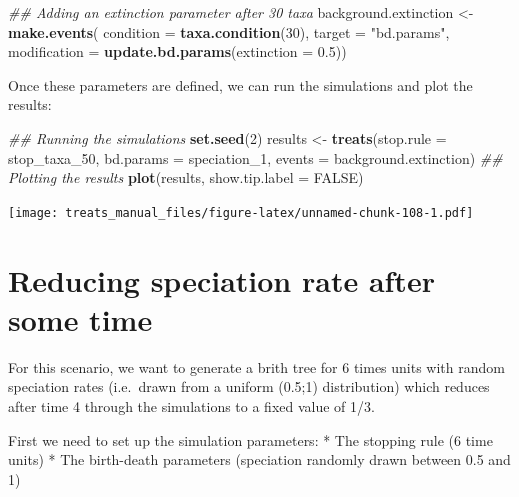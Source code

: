 \documentclass[
]{book}
\newenvironment{Shaded}{\begin{snugshade}}{\end{snugshade}}
\newcommand{\CommentTok}[1]{\textcolor[rgb]{0.56,0.35,0.01}{\textit{#1}}}
\newcommand{\DataTypeTok}[1]{\textcolor[rgb]{0.13,0.29,0.53}{#1}}
\newcommand{\DecValTok}[1]{\textcolor[rgb]{0.00,0.00,0.81}{#1}}
\newcommand{\FloatTok}[1]{\textcolor[rgb]{0.00,0.00,0.81}{#1}}
\newcommand{\KeywordTok}[1]{\textcolor[rgb]{0.13,0.29,0.53}{\textbf{#1}}}
\newcommand{\NormalTok}[1]{#1}
\newcommand{\OtherTok}[1]{\textcolor[rgb]{0.56,0.35,0.01}{#1}}
\newcommand{\StringTok}[1]{\textcolor[rgb]{0.31,0.60,0.02}{#1}}
\begin{document}
\begin{Shaded}
\begin{Highlighting}[]
\CommentTok{\#\# Adding an extinction parameter after 30 taxa}
\NormalTok{background.extinction \textless{}{-}}\StringTok{ }\KeywordTok{make.events}\NormalTok{(}
                      \DataTypeTok{condition    =} \KeywordTok{taxa.condition}\NormalTok{(}\DecValTok{30}\NormalTok{),}
                      \DataTypeTok{target       =} \StringTok{"bd.params"}\NormalTok{,}
                      \DataTypeTok{modification =} \KeywordTok{update.bd.params}\NormalTok{(}\DataTypeTok{extinction =} \FloatTok{0.5}\NormalTok{))}
\end{Highlighting}
\end{Shaded}

Once these parameters are defined, we can run the simulations and plot the results:

\begin{Shaded}
\begin{Highlighting}[]
\CommentTok{\#\# Running the simulations}
\KeywordTok{set.seed}\NormalTok{(}\DecValTok{2}\NormalTok{)}
\NormalTok{results \textless{}{-}}\StringTok{ }\KeywordTok{treats}\NormalTok{(}\DataTypeTok{stop.rule =}\NormalTok{ stop\_taxa\_}\DecValTok{50}\NormalTok{,}
                \DataTypeTok{bd.params =}\NormalTok{ speciation\_}\DecValTok{1}\NormalTok{,}
                \DataTypeTok{events    =}\NormalTok{ background.extinction)}
\CommentTok{\#\# Plotting the results}
\KeywordTok{plot}\NormalTok{(results, }\DataTypeTok{show.tip.label =} \OtherTok{FALSE}\NormalTok{)}
\end{Highlighting}
\end{Shaded}

\texttt{[image: treats\_manual\_files/figure-latex/unnamed-chunk-108-1.pdf]}

\hypertarget{EGred_spec}{%
\section{Reducing speciation rate after some time}\label{EGred_spec}}

For this scenario, we want to generate a brith tree for 6 times units with random speciation rates (i.e.~drawn from a uniform (0.5;1) distribution) which reduces after time 4 through the simulations to a fixed value of 1/3.

First we need to set up the simulation parameters:
* The stopping rule (6 time units)
* The birth-death parameters (speciation randomly drawn between 0.5 and 1)
\end{document}

